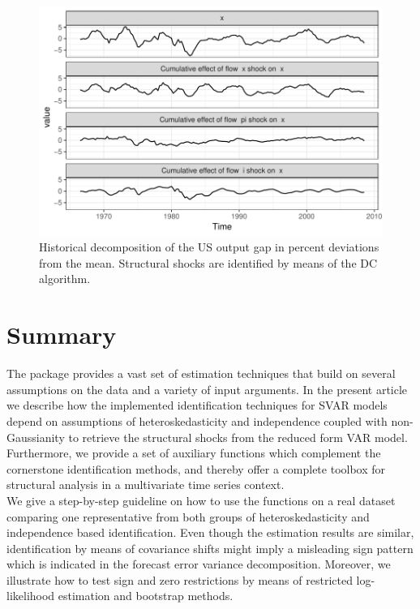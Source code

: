 \documentclass[nojss]{jss}\usepackage[]{graphicx}\usepackage[]{color}
\begin{document}
\begin{figure}[h]
\center
\includegraphics[scale=1]{Figures/hd_dc}
\caption{Historical decomposition of the US output gap in percent deviations from the mean. Structural shocks are identified by means of the DC algorithm.}
\label{fig:hd_dc}
\end{figure}

\section{Summary} \label{sec:summary}
The  package  provides a vast set of estimation techniques that build on several assumptions on the data and a variety of input arguments. In the present article we describe how the implemented identification techniques for SVAR models depend on assumptions of heteroskedasticity and independence coupled with non-Gaussianity to retrieve the structural shocks from the reduced form VAR model. Furthermore, we provide a set of auxiliary functions which complement the cornerstone identification methods, and thereby  offer a complete toolbox for structural analysis in a multivariate time series context.\\

We give a step-by-step guideline on how to use the functions on a real dataset comparing one representative from both groups of heteroskedasticity and independence based identification.
Even though the estimation results are similar, identification by means of covariance shifts might imply a misleading sign pattern which is indicated in the forecast error variance decomposition. Moreover, we illustrate how to test sign and zero restrictions by means of restricted log-likelihood estimation and bootstrap methods.\\
\end{document}
